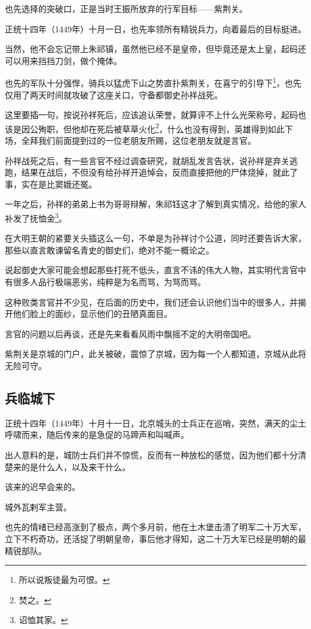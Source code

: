 \begin{multicols}{\theparacolNo}
也先选择的突破口，正是当时王振所放弃的行军目标——紫荆关。

正统十四年（1449年）十月一日，也先率领所有精锐兵力，向着最后的目标挺进。

当然，他不会忘记带上朱祁镇，虽然他已经不是皇帝，但毕竟还是太上皇，起码还可以用来挡挡刀剑，做个掩体。

也先的军队十分强悍，骑兵以猛虎下山之势直扑紫荆关，在喜宁的引导下\footnote{所以说叛徒最为可恨。}，也先仅用了两天时间就攻破了这座关口，守备都御史孙祥战死。

这里要插一句，按说孙祥死后，应该追认荣誉，就算评不上什么光荣称号，起码也该是因公殉职，但他却在死后被草草火化\footnote{焚之。}，什么也没有得到，英雄得到如此下场，全拜我们前面提到过的一位老朋友所赐，这位老朋友就是言官。

孙祥战死之后，有一些言官不经过调查研究，就胡乱发言告状，说孙祥是弃关逃跑，结果在战后，不但没有给孙祥开追悼会，反而直接把他的尸体烧掉，就此了事，实在是比窦娥还冤。

一年之后，孙祥的弟弟上书为哥哥辩解，朱祁钰这才了解到真实情况，给他的家人补发了抚恤金\footnote{诏恤其家。}。

在大明王朝的紧要关头插这么一句，不单是为孙祥讨个公道，同时还要告诉大家，那些以直言敢谏留名青史的御史们，绝对不能一概论之。

说起御史大家可能会想起那些打死不低头，直言不讳的伟大人物，其实明代言官中有很多人品行极端恶劣，纯粹是为名而骂，为骂而骂。

这种败类言官并不少见，在后面的历史中，我们还会认识他们当中的很多人，并揭开他们脸上的面纱，显示他们的丑陋真面目。

言官的问题以后再谈，还是先来看看风雨中飘摇不定的大明帝国吧。

紫荆关是京城的门户，此关被破，震惊了京城，因为每一个人都知道，京城从此将无险可守。

\subsection{兵临城下}
正统十四年（1449年）十月十一日，北京城头的士兵正在巡哨，突然，满天的尘土呼啸而来，随后传来的是急促的马蹄声和叫喊声。

出人意料的是，城防士兵们并不惊慌，反而有一种放松的感觉，因为他们都十分清楚来的是什么人，以及来干什么。

该来的迟早会来的。

城外瓦剌军主营。

也先的情绪已经高涨到了极点，两个多月前，他在土木堡击溃了明军二十万大军，立下不朽奇功，还活捉了明朝皇帝，事后他才得知，这二十万大军已经是明朝的最精锐部队。


\end{multicols}
